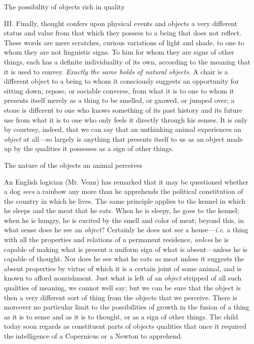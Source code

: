 \documentclass[letterpaper]{book}
\begin{document}
The possibility of objects rich in quality

III. Finally, thought confers upon physical events and objects a very
different status and value from that which they possess to a being that
does not reflect. These words are mere scratches, curious variations of
light and shade, to one to whom they are not linguistic signs. To him
for whom they are signs of other
things,
each has a definite individuality of its own, according to the meaning
that it is used to convey. \emph{Exactly the same holds of natural
objects.} A chair is a different object to a being to whom it
consciously suggests an opportunity for sitting down, repose, or
sociable converse, from what it is to one to whom it presents itself
merely as a thing to be smelled, or gnawed, or jumped over; a stone is
different to one who knows something of its past history and its future
use from what it is to one who only feels it directly through his
senses. It is only by courtesy, indeed, that we can say that an
unthinking animal experiences an \emph{object} at all---so largely is
anything that presents itself to us as an object made up by the
qualities it possesses as a sign of other things.

The nature of the objects an animal perceives

An English logician (Mr. Venn) has remarked that it may be questioned
whether a dog \emph{sees} a rainbow any more than he apprehends the
political constitution of the country in which he lives. The same
principle applies to the kennel in which he sleeps and the meat that he
eats. When he is sleepy, he goes to the kennel; when he is hungry, he is
excited by the smell and color of meat; beyond this, in what sense does
he see an \emph{object}? Certainly he does not see a house---\emph{i.e.}
a thing with all the properties and relations of a permanent residence,
\emph{unless} he is capable of making what is present a uniform sign of
what is absent---unless he is capable of thought. Nor does he see what
he eats \emph{as} meat unless it suggests the absent properties by
virtue of which it is a certain joint of some animal, and is known to
afford nourishment. Just what is left of an \emph{object} stripped of
all such qualities of meaning, we cannot well say; but we can be sure
that the object is then a very different sort of thing from the objects
that we perceive.
There
is moreover no particular limit to the possibilities of growth in the
fusion of a thing as it is to sense and as it is to thought, or as a
sign of other things. The child today soon regards as constituent parts
of objects qualities that once it required the intelligence of a
Copernicus or a Newton to apprehend.
\end{document}
